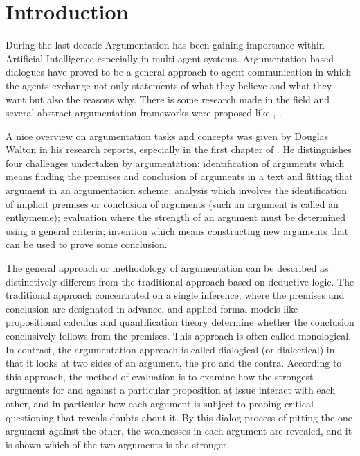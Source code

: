 \section{Introduction}
\par
During the last decade Argumentation has been gaining importance within Artificial Intelligence especially in multi agent systems. Argumentation based dialogues have proved to be a general approach to agent communication in which the agents exchange not only statements of what they believe and what they want but also the reasons why. There is some research made in the field and several abstract argumentation frameworks were proposed like \cite{amgoud2000modelling}, \cite{parsons1998agents}.
\par
A nice overview on argumentation tasks and concepts was given by Douglas Walton in his research reports, especially in the first chapter of \cite{rahwan2009argumentation}. He distinguishes four challenges undertaken by argumentation: identification of arguments which means finding the premises and conclusion of arguments in a text and fitting that argument in an argumentation scheme; analysis which involves the identification of implicit premises or conclusion of arguments (such an argument is called an enthymeme); evaluation where the strength of an argument must be determined using a general criteria; invention which means constructing new arguments that can be used to prove some conclusion.
\par
The general approach or methodology of argumentation can be described as distinctively different from the traditional approach based on deductive logic. The traditional approach concentrated on a single inference, where the premises and conclusion are designated in advance, and applied formal models like propositional calculus and quantification theory determine whether the conclusion conclusively follows from the premises. This approach is often called monological. In contrast, the argumentation approach is called dialogical (or dialectical) in that it looks at two sides of an argument, the pro and the contra. According to this approach, the method of evaluation is to examine how the strongest arguments for and against a particular proposition at issue interact with each other, and in particular how each argument is subject to probing critical questioning that reveals doubts about it. By this dialog process of pitting the one argument against the other, the weaknesses in each argument are revealed, and it is shown which of the two arguments is the stronger.
